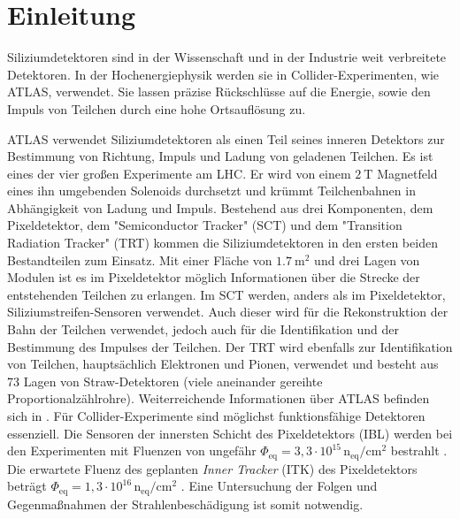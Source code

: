\chapter{Einleitung}
Siliziumdetektoren sind in der Wissenschaft und in der Industrie weit verbreitete
Detektoren. In der Hochenergiephysik werden sie in Collider-Experimenten, wie ATLAS, verwendet.
Sie  lassen präzise Rückschlüsse auf die Energie, sowie den Impuls von Teilchen durch eine
hohe Ortsauflösung zu.


ATLAS verwendet Siliziumdetektoren als
einen Teil seines inneren Detektors zur Bestimmung von Richtung, Impuls
und Ladung von geladenen Teilchen. Es ist eines der vier großen Experimente am LHC.
Er wird von einem $\SI{2}{\tesla}$ Magnetfeld eines ihn umgebenden Solenoids
durchsetzt und krümmt Teilchenbahnen in Abhängigkeit von Ladung und Impuls.
Bestehend aus drei Komponenten, dem Pixeldetektor, dem "Semiconductor Tracker" (SCT) und dem "Transition Radiation Tracker" (TRT) kommen  die
Siliziumdetektoren in den ersten beiden Bestandteilen zum Einsatz.
Mit einer Fläche von $\SI{1.7}{\meter\squared}$ und drei Lagen von Modulen
ist es im Pixeldetektor möglich
Informationen über die Strecke der entstehenden Teilchen zu erlangen.
Im SCT werden, anders als im Pixeldetektor, Siliziumstreifen-Sensoren verwendet.
Auch dieser wird für
die Rekonstruktion der Bahn der Teilchen verwendet, jedoch auch für die Identifikation und der Bestimmung des Impulses der Teilchen.
Der TRT wird ebenfalls zur Identifikation von Teilchen, hauptsächlich Elektronen und Pionen, verwendet und besteht aus 73 Lagen
von Straw-Detektoren (viele aneinander gereihte Proportionalzählrohre).
Weiterreichende Informationen über ATLAS befinden sich in \cite{ATLAS}.
Für Collider-Experimente sind möglichst funktionsfähige Detektoren essenziell.
Die Sensoren der innersten Schicht des Pixeldetektors (IBL)
werden bei den Experimenten mit Fluenzen von ungefähr $\Phi_{\mathrm{eq}} =3,3\cdot 10^{15} \, \mathrm{n_{eq}/cm^2}$ bestrahlt \cite{Capeans:1291633}.
Die erwartete Fluenz des geplanten \textit{Inner Tracker} (ITK) des Pixeldetektors beträgt
$\Phi_{\mathrm{eq}} =1,3\cdot 10^{16} \, \mathrm{n_{eq}/cm^2}$ \cite{itk}. Eine Untersuchung
der Folgen und Gegenmaßnahmen der Strahlenbeschädigung ist somit notwendig.


